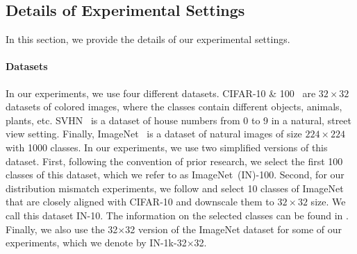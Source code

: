 \documentclass[conference]{IEEEtran}
\theoremstyle{definition}
\theoremstyle{remark}
\theoremstyle{proposition}
\begin{document}
\subsection{Details of Experimental Settings}\label{sec:sec:settings}
In this section, we provide the details of our experimental settings.

\paragraph{Datasets}
In our experiments, we use four different datasets.
CIFAR-10 \& 100~\citep{krizhevsky2009learning} are $32\times32$ datasets of colored images, where the classes contain different objects, animals, plants, etc.
SVHN~\citep{netzer2011svhn} is a dataset of house numbers from 0 to 9 in a natural, street view setting.
Finally, ImageNet~\citep{russakovsky2015imagenet} is a dataset of natural images of size $224 \times 224$ with 1000 classes.
In our experiments, we use two simplified versions of this dataset.
First, following the convention of prior research, we select the first 100 classes of this dataset, which we refer to as ImageNet~(IN)-100.
Second, for our distribution mismatch experiments, we follow \citet{huang2021emn} and select 10 classes of ImageNet that are closely aligned with CIFAR-10 and downscale them to $32\times32$ size.
We call this dataset IN-10.
The information on the selected classes can be found in .
Finally, we also use the 32$\times$32 version of the ImageNet dataset for some of our experiments, which we denote by IN-1k-32$\times$32.
\end{document}
